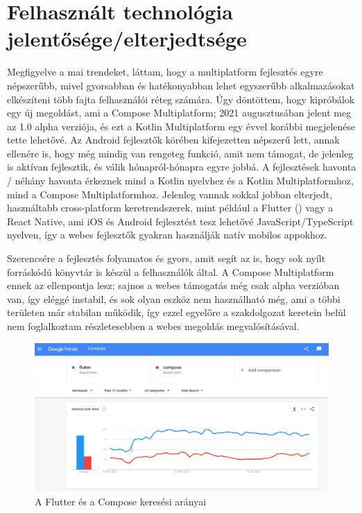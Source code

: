 \section{Felhasznált technológia jelentősége/elterjedtsége}
\label{sec:IntroductionTechnologies}

Megfigyelve a mai trendeket, láttam, hogy a multiplatform fejlesztés egyre népszerűbb, mivel gyorsabban és hatékonyabban lehet egyszerűbb alkalmazásokat elkészíteni több fajta felhasználói réteg számára.
Úgy döntöttem, hogy kipróbálok egy új megoldást, ami a Compose Multiplatform; 2021 augusztusában jelent meg az 1.0 alpha verziója, és ezt a Kotlin Multiplatform egy évvel korábbi megjelenése tette lehetővé.
Az Android fejlesztők körében kifejezetten népszerű lett, annak ellenére is, hogy még mindig van rengeteg funkció, amit nem támogat, de jelenleg is aktívan fejlesztik, és válik hónapról-hónapra egyre jobbá.
A fejlesztések havonta / néhány havonta érkeznek mind a Kotlin nyelvhez és a Kotlin Multiplatformhoz\cite[]{KotlinMultiplatformRelease}, mind a Compose Multiplatformhoz\cite{ComposeMultiplatformRelease}.
Jelenleg vannak sokkal jobban elterjedt, használtabb cross-platform keretrendszerek, mint például a Flutter () vagy a React Native, ami iOS és Android fejlesztést tesz lehetővé JavaScript/TypeScript nyelven, így a webes fejlesztők gyakran használják natív mobilos appokhoz.

Szerencsére a fejlesztés folyamatos és gyors, amit segít az is, hogy sok nyílt forráskódú könyvtár is készül a felhasználók által.\cite{KotlinMultiplatformStable}
A Compose Multiplatform ennek az ellenpontja lesz\cite{KotlinCrossPlatformFrameworks}; sajnos a webes támogatás még csak alpha verzióban van, így eléggé instabil, és sok olyan eszköz nem használható még, ami a többi területen már stabilan működik, így ezzel egyelőre a szakdolgozat keretein belül nem foglalkoztam részletesebben a webes megoldás megvalósításával.

\begin{figure}[!ht]
    \centering
    \includegraphics[width=150mm, keepaspectratio]{figures/flutter-vs-jetpack-compose-google-search-trends.png}
    \caption{A Flutter és a Compose keresési arányai \cite{FlutterVsCompose}}
    \label{fig:FlutterVsCompose}
\end{figure}

